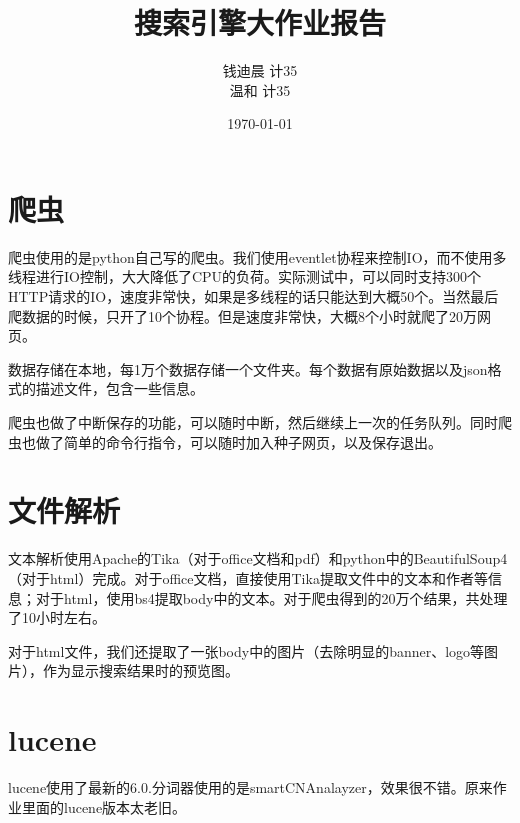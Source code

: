 \documentclass[11pt, a4paper]{article}
\title{\textbf{搜索引擎大作业报告}}
\author{
    \kai 钱迪晨 \quad 计35 \quad 2013011402 \\
    \kai 温和 \quad 计35 \quad 2013011407
}
\date{\kai\today}
\begin{document}

\maketitle

\section{爬虫}
爬虫使用的是python自己写的爬虫。我们使用eventlet协程来控制IO，而不使用多线程进行IO控制，大大降低了CPU的负荷。实际测试中，可以同时支持300个HTTP请求的IO，速度非常快，如果是多线程的话只能达到大概50个。当然最后爬数据的时候，只开了10个协程。但是速度非常快，大概8个小时就爬了20万网页。

数据存储在本地，每1万个数据存储一个文件夹。每个数据有原始数据以及json格式的描述文件，包含一些信息。

爬虫也做了中断保存的功能，可以随时中断，然后继续上一次的任务队列。同时爬虫也做了简单的命令行指令，可以随时加入种子网页，以及保存退出。

\section{文件解析}
文本解析使用Apache的Tika（对于office文档和pdf）和python中的BeautifulSoup4（对于html）完成。对于office文档，直接使用Tika提取文件中的文本和作者等信息；对于html，使用bs4提取body中的文本。对于爬虫得到的20万个结果，共处理了10小时左右。

对于html文件，我们还提取了一张body中的图片（去除明显的banner、logo等图片），作为显示搜索结果时的预览图。

\section{lucene}
lucene使用了最新的6.0.分词器使用的是smartCNAnalayzer，效果很不错。原来作业里面的lucene版本太老旧。
\end{document}
